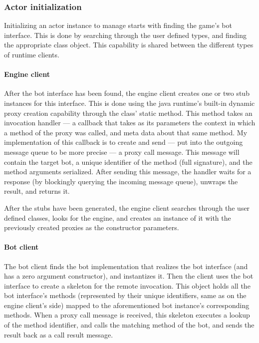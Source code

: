 		\subsubsection*{Actor initialization}
		
		Initializing an actor instance to manage starts with finding the game's bot interface. This is done by searching through the user defined types, and finding the appropriate class object. This capability is shared between the different types of runtime clients.
		
			\paragraph{Engine client}
		
			After the bot interface has been found, the engine client creates one or two stub instances for this interface. This is done using the java runtime's built-in dynamic proxy creation capability through the  class' static  method. This method takes an invocation handler --- a callback that takes as its parameters the context in which a method of the proxy was called, and meta data about that same method. My implementation of this callback is to create and send --- put into the outgoing message queue to be more precise --- a proxy call message. This message will contain the target bot, a unique identifier of the method (full signature), and the method arguments serialized. After sending this message, the handler waits for a response (by blockingly querying the incoming message queue), unwraps the result, and returns it.
			
			After the stubs have been generated, the engine client searches through the user defined classes, looks for the engine, and creates an instance of it with the previously created proxies as the constructor parameters.
			
			\paragraph{Bot client}
			
			The bot client finds the bot implementation that realizes the bot interface (and has a zero argument constructor), and instantizes it. Then the client uses the bot interface to create a skeleton for the remote invocation. This object holds all the bot interface's methods (represented by their unique identifiers, same as on the engine client's side) mapped to the aforementioned bot instance's corresponding methods. When a proxy call message is received, this skeleton executes a lookup of the method identifier, and calls the matching method of the bot, and sends the result back as a call result message. 
			
%






